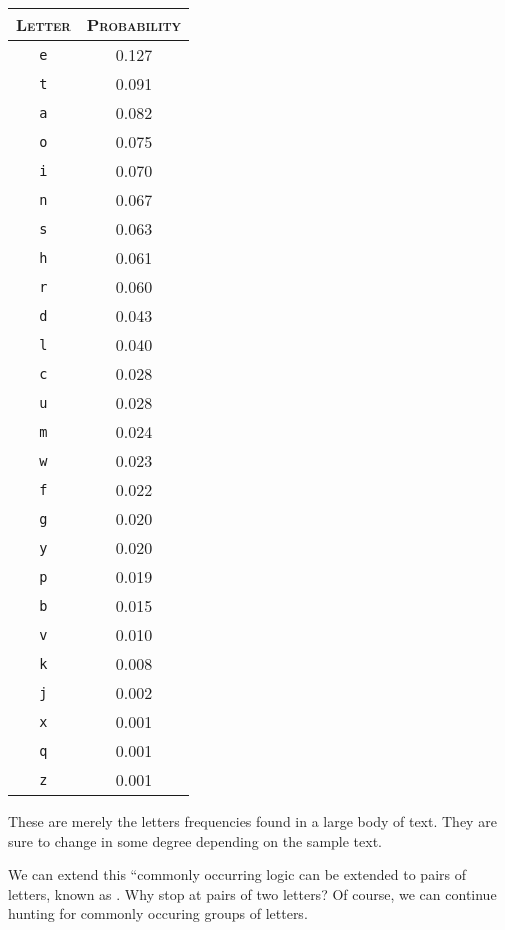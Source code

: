 \begin{center}
  \begin{tabular} {|c|c|}
    \hline
    \textsc{Letter} & \textsc{Probability} \\
    \hline
    \texttt{e} & 0.127 \\
    \hline
    \texttt{t} & 0.091 \\
    \texttt{a} & 0.082 \\
    \texttt{o} & 0.075 \\
    \texttt{i} & 0.070 \\
    \texttt{n} & 0.067 \\
    \texttt{s} & 0.063 \\
    \texttt{h} & 0.061 \\
    \texttt{r} & 0.060 \\
    \hline
    \texttt{d} & 0.043 \\
    \texttt{l} & 0.040 \\
    \hline
    \texttt{c} & 0.028 \\
    \texttt{u} & 0.028 \\
    \texttt{m} & 0.024 \\
    \texttt{w} & 0.023 \\
    \texttt{f} & 0.022 \\
    \texttt{g} & 0.020 \\
    \texttt{y} & 0.020 \\
    \texttt{p} & 0.019 \\
    \texttt{b} & 0.015 \\
    \hline
    \texttt{v} & 0.010 \\
    \texttt{k} & 0.008 \\
    \texttt{j} & 0.002 \\
    \texttt{x} & 0.001 \\
    \texttt{q} & 0.001 \\
    \texttt{z} & 0.001 \\
    \hline
  \end{tabular}
\end{center}

These are merely the letters frequencies found in a large body of text.
They are sure to change in some degree depending on the sample text.

We can extend this ``commonly occurring logic can be extended to pairs of
letters, known as . Why stop at pairs of two letters?
Of course, we can continue hunting for commonly occuring groups of letters.

